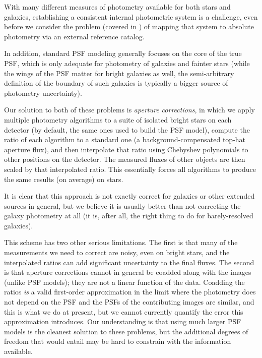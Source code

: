 With many different measures of photometry available for both stars and galaxies, establishing a consistent internal photometric system is a challenge, even before we consider the problem (covered in ) of mapping that system to absolute photometry via an external reference catalog.

In addition, standard PSF modeling  generally focuses on the core of the true PSF, which is only adequate for photometry of galaxies and fainter stars (while the wings of the PSF matter for bright galaxies as well, the semi-arbitrary definition of the boundary of such galaxies is typically a bigger source of photometry uncertainty).

Our solution to both of these problems is \emph{aperture corrections}, in which we apply multiple photometry algorithms to a suite of isolated bright stars on each detector (by default, the same ones used to build the PSF model), compute the ratio of each algorithm to a standard one (a background-compensated top-hat aperture flux), and then interpolate that ratio using Chebyshev polynomials to other positions on the detector.
The measured fluxes of other objects are then scaled by that interpolated ratio.
This essentially forces all algorithms to produce the same results (on average) on stars.

It is clear that this approach is not exactly correct for galaxies or other extended sources in general, but we believe it is usually better than not correcting the galaxy photometry at all (it is, after all, the right thing to do for barely-resolved galaxies).

This scheme has two other serious limitations.
The first is that many of the measurements we need to correct are noisy, even on bright stars, and the interpolated ratios can add significant uncertainty to the final fluxes.
The second is that aperture corrections cannot in general be coadded along with the images (unlike PSF models); they are not a linear function of the data.
Coadding the ratios \emph{is} a valid first-order approximation in the limit where the photometry does not depend on the PSF and the PSFs of the contributing images are similar, and this is what we do at present, but we cannot currently  quantify the error this approximation introduces.
Our understanding is that using much larger PSF models is the cleanest solution to these problems, but the additional degrees of freedom that would entail may be hard to constrain with the information available.

